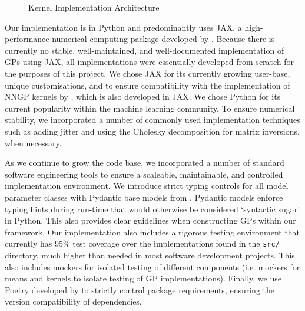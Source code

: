 \documentclass{article}
\def\code#1{\texttt{#1}}
\numberwithin{equation}{section}
\begin{document}
\begin{figure}[h!]
\begin{center}
{
}
\caption{Kernel Implementation Architecture}
\label{kernel-implementation}
\end{center}
\end{figure}

Our implementation is in Python and predominantly uses JAX, a high-performance numerical computing package developed by \cite{jax2018github}. 
Because there is currently no stable, well-maintained, and well-documented implementation of GPs using JAX, all implementations were essentially developed from scratch for the purposes of this project.
We chose JAX for its currently growing user-base, unique customisations, and to ensure compatibility with the implementation of NNGP kernels by \cite{novak2019neural}, which is also developed in JAX. 
We chose Python for its current popularity within the machine learning community.
To ensure numerical stability, we incorporated a number of commonly used implementation techniques such as adding jitter and using the Cholesky decomposition for matrix inversions, when necessary.

As we continue to grow the code base, we incorporated a number of standard software engineering tools to ensure a scaleable, maintainable, and controlled implementation environment.
We introduce strict typing controls for all model parameter classes with Pydantic base models from \cite{samuel_colvin_2023_8277473}. 
Pydantic models enforce typing hints during run-time that would otherwise be considered `syntactic sugar' in Python. This also provides clear guidelines when constructing GPs within our framework.
Our implementation also includes a rigorous testing environment that currently has 95\% test coverage over the implementations found in the \code{src/} directory, much higher than needed in most software development projects.
This also includes mockers for isolated testing of different components (i.e. mockers for means and kernels to isolate testing of GP implementations). Finally, we use Poetry developed by \cite{Eustace} to strictly control package requirements, ensuring the version compatibility of dependencies.
\end{document}
